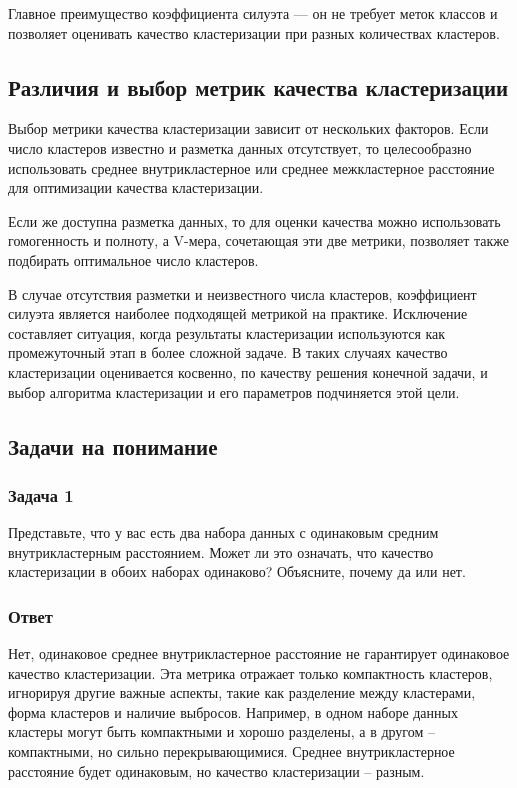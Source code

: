 Главное преимущество коэффициента силуэта — он не требует меток классов и позволяет оценивать качество кластеризации при разных количествах кластеров.

\subsection{Различия и выбор метрик качества кластеризации}

Выбор метрики качества кластеризации зависит от нескольких факторов. Если число кластеров известно и разметка данных отсутствует, то целесообразно использовать среднее внутрикластерное или среднее межкластерное расстояние для оптимизации качества кластеризации. 

Если же доступна разметка данных, то для оценки качества можно использовать гомогенность и полноту, а V-мера, сочетающая эти две метрики, позволяет также подбирать оптимальное число кластеров.

В случае отсутствия разметки и неизвестного числа кластеров, коэффициент силуэта является наиболее подходящей метрикой на практике. Исключение составляет ситуация, когда результаты кластеризации используются как промежуточный этап в более сложной задаче. В таких случаях качество кластеризации оценивается косвенно, по качеству решения конечной задачи, и выбор алгоритма кластеризации и его параметров подчиняется этой цели.

\subsection{Задачи на понимание}
\subsubsection{Задача 1}

Представьте, что у вас есть два набора данных с одинаковым средним внутрикластерным расстоянием. Может ли это означать, что качество кластеризации в обоих наборах одинаково? Объясните, почему да или нет.

\subsubsection{Ответ}

Нет, одинаковое среднее внутрикластерное расстояние не гарантирует одинаковое качество кластеризации. Эта метрика отражает только компактность кластеров, игнорируя другие важные аспекты, такие как разделение между кластерами, форма кластеров и наличие выбросов. Например, в одном наборе данных кластеры могут быть компактными и хорошо разделены, а в другом -- компактными, но сильно перекрывающимися. Среднее внутрикластерное расстояние будет одинаковым, но качество кластеризации -- разным.

